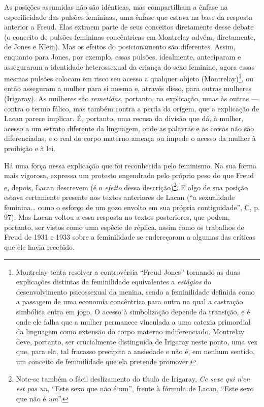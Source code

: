 As posições assumidas não são idênticas, mas compartilham a ênfase na
especificidade das pulsões femininas, uma ênfase que estava na base da
resposta anterior a Freud. Elas extraem parte de seus conceitos
diretamente desse debate (o conceito de pulsões femininas concêntricas
em Montrelay advém, diretamente, de Jones e Klein). Mas os efeitos do
posicionamento são diferentes. Assim, enquanto para Jones, por exemplo,
essas pulsões, idealmente, anteciparam e asseguraram a identidade
heterossexual da criança do sexo feminino, agora essas mesmas pulsões
colocam em risco seu acesso a qualquer objeto (Montrelay)\footnote{Montrelay
  tenta resolver a controvérsia ``Freud-Jones'' tornando as duas
  explicações distintas da feminilidade equivalentes a \emph{estágios}
  do desenvolvimento psicossexual da menina, sendo a feminilidade
  definida como a passagem de uma economia concêntrica para outra na
  qual a castração simbólica entra em jogo. O acesso à simbolização
  depende da transição, e é onde ele falha que a mulher permanece
  vinculada a uma catexia primordial da linguagem como extensão do corpo
  materno indiferenciado. Montrelay deve, portanto, ser crucialmente
  distinguida de Irigaray neste ponto, uma vez que, para ela, tal
  fracasso precipita a ansiedade e não é, em nenhum sentido, um conceito
  de feminilidade que ela pretende promover.}, ou então asseguram a
mulher para si mesma e, através disso, para outras mulheres (Irigaray).
As mulheres são \emph{remetidas}, portanto, na explicação, umas às
outras --- contra o termo fálico, mas também contra a perda da origem,
que a explicação de Lacan parece implicar. É, portanto, uma recusa da
divisão que dá, à mulher, acesso a um estrato diferente da linguagem,
onde as palavras e as coisas não são diferenciadas, e o real do corpo
materno ameaça ou impede o acesso da mulher à proibição e à lei.

Há uma força nessa explicação que foi reconhecida pelo feminismo. Na sua
forma mais vigorosa, expressa um protesto engendrado pelo próprio peso
do que Freud e, depois, Lacan descrevem (é o \emph{efeito} dessa
descrição)\footnote{Note-se também o fácil deslizamento do título de
  Irigaray, \emph{Ce sexe qui n'en est pas un}, ``Este sexo que não é
  um'', frente à fórmula de Lacan, ``Este sexo que não é \emph{um}''.}.
E algo de sua posição estava certamente presente nos textos anteriores
de Lacan (``a sexualidade feminina\ldots{} como o esforço de um gozo envolto
em sua própria contiguidade'', C, p. 97). Mas Lacan voltou a essa
resposta no textos posteriores, que podem, portanto, ser vistos como uma
espécie de réplica, assim como os trabalhos de Freud de 1931 e 1933
sobre a feminilidade se endereçaram a algumas das críticas que ele havia
recebido.

